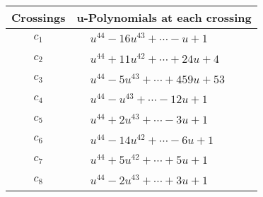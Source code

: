 \documentclass[1p]{elsarticle_modified}
\theoremstyle{definition}
\begin{document}
\begin{tabular}{m{50pt}|m{274pt}}
Crossings & \hspace{64pt}u-Polynomials at each crossing \\
\hline $$\begin{aligned}c_{1}\end{aligned}$$&$\begin{aligned}
&u^{44}-16 u^{43}+\cdots- u+1
\end{aligned}$\\
\hline $$\begin{aligned}c_{2}\end{aligned}$$&$\begin{aligned}
&u^{44}+11 u^{42}+\cdots+24 u+4
\end{aligned}$\\
\hline $$\begin{aligned}c_{3}\end{aligned}$$&$\begin{aligned}
&u^{44}-5 u^{43}+\cdots+459 u+53
\end{aligned}$\\
\hline $$\begin{aligned}c_{4}\end{aligned}$$&$\begin{aligned}
&u^{44}- u^{43}+\cdots-12 u+1
\end{aligned}$\\
\hline $$\begin{aligned}c_{5}\end{aligned}$$&$\begin{aligned}
&u^{44}+2 u^{43}+\cdots-3 u+1
\end{aligned}$\\
\hline $$\begin{aligned}c_{6}\end{aligned}$$&$\begin{aligned}
&u^{44}-14 u^{42}+\cdots-6 u+1
\end{aligned}$\\
\hline $$\begin{aligned}c_{7}\end{aligned}$$&$\begin{aligned}
&u^{44}+5 u^{42}+\cdots+5 u+1
\end{aligned}$\\
\hline $$\begin{aligned}c_{8}\end{aligned}$$&$\begin{aligned}
&u^{44}-2 u^{43}+\cdots+3 u+1
\end{aligned}$\\

\end{tabular}
\end{document}
